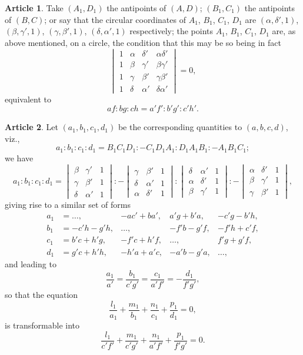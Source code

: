 \documentclass[11pt,a4paper]{article}
\theoremstyle{definition}
\newtheorem{art}{Article}
\begin{document}
\begin{art}
Take $(A_{1}, D_{1})$ the antipoints of $(A, D)$; $(B_{1}, C_{1})$ the antipoints of $(B, C)$; or say that the circular coordinates of $A_{1}$, $B_{1}$, $C_{1}$, $D_{1}$ are $(\alpha, \delta', 1)$, $(\beta, \gamma', 1)$, $(\gamma, \beta', 1)$, $(\delta, \alpha', 1)$ respectively; the points $A_{1}$, $B_{1}$, $C_{1}$, $D_{1}$ are, as above mentioned, on a circle, the condition that this may be so being in fact
\[
\begin{vmatrix}
1 & \alpha & \delta' & \alpha\delta' \\
1 & \beta & \gamma' & \beta\gamma' \\
1 & \gamma & \beta' & \gamma\beta' \\
1 & \delta & \alpha' & \delta\alpha'
\end{vmatrix} = 0,
\]
equivalent to
\[
af : bg : ch = a'f' : b'g' : c'h'.
\]
\end{art}

\begin{art}
Let $(a_{1}, b_{1}, c_{1}, d_{1})$ be the corresponding quantities to $(a, b, c, d)$, viz.,
\[
a_{1} : b_{1} : c_{1} : d_{1} = B_{1}C_{1}D_{1} : -C_{1}D_{1}A_{1} : D_{1}A_{1}B_{1} : -A_{1}B_{1}C_{1};
\]
we have
\[
a_{1} : b_{1} : c_{1} : d_{1} = \begin{vmatrix} \beta & \gamma' & 1 \\ \gamma & \beta' & 1 \\ \delta & \alpha' & 1 \end{vmatrix} : -\begin{vmatrix} \gamma & \beta' & 1 \\ \delta & \alpha' & 1 \\ \alpha & \delta' & 1 \end{vmatrix} : \begin{vmatrix} \delta & \alpha' & 1 \\ \alpha & \delta' & 1 \\ \beta & \gamma' & 1 \end{vmatrix} : -\begin{vmatrix} \alpha & \delta' & 1 \\ \beta & \gamma' & 1 \\ \gamma & \beta' & 1 \end{vmatrix},
\]
giving rise to a similar set of forms
\begin{align*}
a_{1} &= \ldots, & -ac' + ba', & a'g + b'a, & -c'g - b'h, \\
b_{1} &= -c'h - g'h, & \ldots, & -f'b - g'f, & -f'h + c'f, \\
c_{1} &= b'c + h'g, & -f'c + h'f, & \ldots, & f'g + g'f, \\
d_{1} &= g'c + h'h, & -h'a + a'c, & -a'b - g'a, & \ldots,
\end{align*}
and leading to
\[
\frac{a_{1}}{a'} = \frac{b_{1}}{c'g'} = \frac{c_{1}}{a'f'} = -\frac{d_{1}}{f'g'},
\]
so that the equation
\[
\frac{l_{1}}{a_{1}} + \frac{m_{1}}{b_{1}} + \frac{n_{1}}{c_{1}} + \frac{p_{1}}{d_{1}} = 0,
\]
is transformable into
\[
\frac{l_{1}}{c'f'} + \frac{m_{1}}{c'g'} + \frac{n_{1}}{a'f'} + \frac{p_{1}}{f'g'} = 0.
\]
\end{art}
\end{document}

